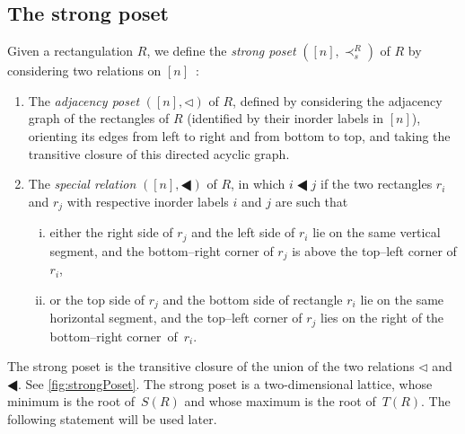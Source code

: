 \documentclass{amsart}
\theoremstyle{definition}
\newcommand{\darkblue}{\color{darkblue}} %
\newcommand{\defn}[1]{\textsl{\darkblue #1}} %
\newcommand{\tri}{\lhd}
\newcommand{\btri}{\LHD}
\begin{document}

\subsection{The strong poset}
\label{subsec:strongPoset}

Given a rectangulation $R$, we define the \defn{strong poset} $([n],\prec_s^R)$ of $R$ by considering two relations on $[n]$~\cite{ACFF24}:
\begin{enumerate}
\item The \defn{adjacency poset} $([n],\tri)$ of $R$, defined by considering the adjacency graph of the rectangles of $R$ (identified by their inorder labels in $[n]$), orienting its edges from left to right and from bottom to top, and taking the transitive closure of this directed acyclic graph.
\item The \defn{special relation} $([n],\btri)$ of $R$, in which $i\btri j$ if the two rectangles $r_i$ and $r_j$ with respective inorder labels $i$ and $j$ are such that 
	\begin{enumerate}[(i)]
	\item either the right side of $r_j$ and the left side of $r_i$ lie on the same vertical segment, and the bottom--right corner of $r_j$ is above the top--left corner of $r_i$, 
	\item or the top side of $r_j$ and the bottom side of rectangle $r_i$ lie on the same horizontal segment, and the top--left corner of $r_j$ lies on the right of the bottom--right corner~of~$r_i$.
	\end{enumerate}
\end{enumerate}
The strong poset is the transitive closure of the union of the two relations $\tri$ and $\btri$.
See \cref{fig:strongPoset}.
The strong poset is a two-dimensional lattice, whose minimum is the root of~$S(R)$ and whose maximum is the root of~$T(R)$. The following statement will be used later.
\end{document}
